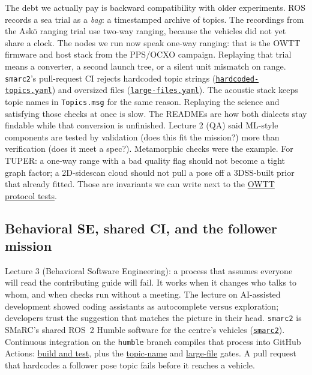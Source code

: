 \documentclass[11pt,a4paper,twocolumn]{amsart}
\begin{document}
The debt we actually pay is backward compatibility with older experiments. ROS records a sea trial as a \emph{bag}: a timestamped archive of topics. The recordings from the Ask\"{o} ranging trial use two-way ranging, because the vehicles did not yet share a clock. The nodes we run now speak one-way ranging: that is the OWTT firmware and host stack from the PPS/OCXO campaign. Replaying that trial means a converter, a second launch tree, or a silent unit mismatch on range. \texttt{smarc2}'s pull-request CI rejects hardcoded topic strings (\href{https://github.com/smarc-project/smarc2/blob/humble/.github/workflows/hardcoded-topics.yaml}{\texttt{hardcoded-topics.yaml}}) and oversized files (\href{https://github.com/smarc-project/smarc2/blob/humble/.github/workflows/large-files.yaml}{\texttt{large-files.yaml}}). The acoustic stack keeps topic names in \texttt{Topics.msg} for the same reason. Replaying the science and satisfying those checks at once is slow. The READMEs are how both dialects stay findable while that conversion is unfinished. Lecture 2 (QA) said ML-style components are tested by validation (does this fit the mission?) more than verification (does it meet a spec?). Metamorphic checks were the example. For TUPER: a one-way range with a bad quality flag should not become a tight graph factor; a 2D-sidescan cloud should not pull a pose off a 3DSS-built prior that already fitted. Those are invariants we can write next to the \href{https://github.com/NinjaTuna007/serial_ping_pkg/blob/main/serial_ping_pkg/test/test_owtt_protocol.py}{OWTT protocol tests}.

\subsection{Behavioral SE, shared CI, and the follower mission}
\label{sec:bse}

Lecture 3 (Behavioral Software Engineering): a process that assumes everyone will read the contributing guide will fail. It works when it changes who talks to whom, and when checks run without a meeting. The lecture on AI-assisted development showed coding assistants as autocomplete versus exploration; developers trust the suggestion that matches the picture in their head. \texttt{smarc2} is SMaRC's shared ROS~2 Humble software for the centre's vehicles (\href{https://github.com/smarc-project/smarc2}{\texttt{smarc2}}). Continuous integration on the \texttt{humble} branch compiles that process into GitHub Actions: \href{https://github.com/smarc-project/smarc2/blob/humble/.github/workflows/smarc2-humble.yaml}{build and test}, plus the \href{https://github.com/smarc-project/smarc2/blob/humble/.github/workflows/hardcoded-topics.yaml}{topic-name} and \href{https://github.com/smarc-project/smarc2/blob/humble/.github/workflows/large-files.yaml}{large-file} gates. A pull request that hardcodes a follower pose topic fails before it reaches a vehicle.
\end{document}

